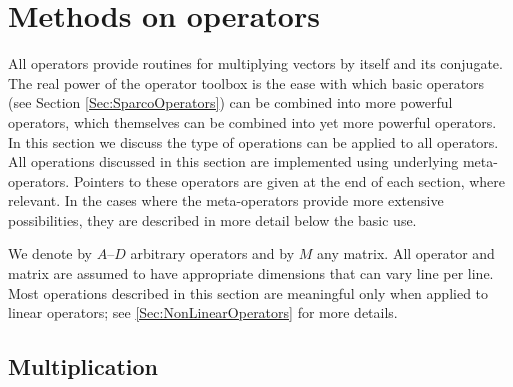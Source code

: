 \chapter{Methods on operators}\label{Sec:SparcoMetaOp} %

All \sparco{} operators provide routines for multiplying vectors by
itself and its conjugate. The real power of the operator toolbox is
the ease with which basic operators (see Section
\ref{Sec:SparcoOperators}) can be combined into more powerful
operators, which themselves can be combined into yet more powerful
operators. In this section we discuss the type of operations can be
applied to all \sparco{} operators. All operations discussed in this
section are implemented using underlying meta-operators. Pointers to
these operators are given at the end of each section, where
relevant. In the cases where the meta-operators provide more extensive
possibilities, they are described in more detail below the basic use.

We denote by $A$--$D$ arbitrary \sparco{} operators and by $M$ any
matrix. All operator and matrix are assumed to have appropriate
dimensions that can vary line per line. Most operations described in
this section are meaningful only when applied to linear operators; see
\ref{Sec:NonLinearOperators} for more details.

\section{Multiplication}


